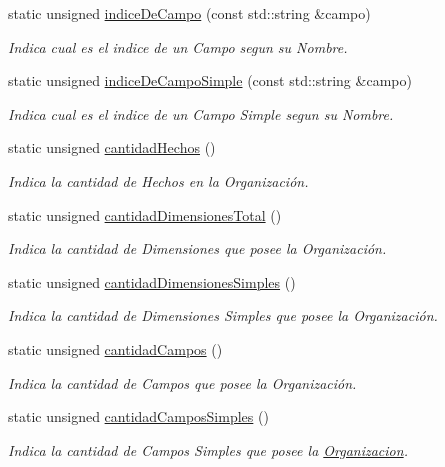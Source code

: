 \begin{DoxyCompactItemize}
static unsigned \hyperlink{classOrganizacion_ab5305f1db341422c2993403f7341ddbd}{indice\-De\-Campo} (const std\-::string \&campo)
\begin{DoxyCompactList}\small\item\em \-Indica cual es el indice de un \-Campo segun su \-Nombre. \end{DoxyCompactList}\item 
static unsigned \hyperlink{classOrganizacion_a45acfeb9509942abf6ed92e71172956b}{indice\-De\-Campo\-Simple} (const std\-::string \&campo)
\begin{DoxyCompactList}\small\item\em \-Indica cual es el indice de un \-Campo \-Simple segun su \-Nombre. \end{DoxyCompactList}\item 
static unsigned \hyperlink{classOrganizacion_afb5a828d0c88b8ee98dfff1312ab8b5f}{cantidad\-Hechos} ()
\begin{DoxyCompactList}\small\item\em \-Indica la cantidad de \-Hechos en la \-Organización. \end{DoxyCompactList}\item 
static unsigned \hyperlink{classOrganizacion_ac42240de149c9d37c7c7c643a088c674}{cantidad\-Dimensiones\-Total} ()
\begin{DoxyCompactList}\small\item\em \-Indica la cantidad de \-Dimensiones que posee la \-Organización. \end{DoxyCompactList}\item 
static unsigned \hyperlink{classOrganizacion_a1de553b411941d89bec3327f94e9f323}{cantidad\-Dimensiones\-Simples} ()
\begin{DoxyCompactList}\small\item\em \-Indica la cantidad de \-Dimensiones \-Simples que posee la \-Organización. \end{DoxyCompactList}\item 
static unsigned \hyperlink{classOrganizacion_a160c3a4f7cc86807c244f6904a3c1adf}{cantidad\-Campos} ()
\begin{DoxyCompactList}\small\item\em \-Indica la cantidad de \-Campos que posee la \-Organización. \end{DoxyCompactList}\item 
static unsigned \hyperlink{classOrganizacion_a8b6bf6303d8ccfa9b36d1b1389f0bef5}{cantidad\-Campos\-Simples} ()
\begin{DoxyCompactList}\small\item\em \-Indica la cantidad de \-Campos \-Simples que posee la \hyperlink{classOrganizacion}{\-Organizacion}. \end{DoxyCompactList}\end{DoxyCompactItemize}



